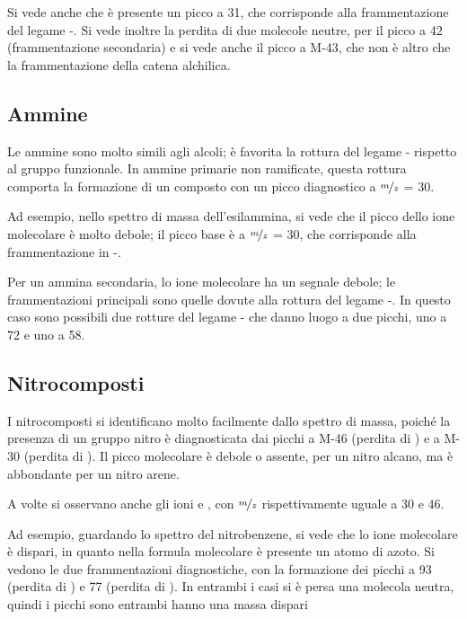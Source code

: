 Si vede anche che è presente un picco a 31, che corrisponde alla
frammentazione del legame \alpha-\beta{}. Si vede inoltre la perdita di
due molecole neutre, per il picco a 42 (frammentazione secondaria) e si
vede anche il picco a M-43, che non è altro che la frammentazione della
catena alchilica.

\subsection{Ammine}

Le ammine sono molto simili agli alcoli; è favorita la rottura del
legame \alpha-\beta{} rispetto al gruppo funzionale. In ammine primarie
non ramificate, questa rottura comporta la formazione di un composto con
un picco diagnostico a $\nicefrac{m}{z}$ = 30.


Ad esempio, nello spettro di massa dell'esilammina, si vede che il picco
dello ione molecolare è molto debole; il picco base è a $\nicefrac{m}{z}$ = 30, che
corrisponde alla frammentazione in \alpha-\beta{}.


Per un ammina secondaria, lo ione molecolare ha un segnale debole; le
frammentazioni principali sono quelle dovute alla rottura del legame
\alpha-\beta{}. In questo caso sono possibili due rotture del legame
\alpha-\beta{} che danno luogo a due picchi, uno a 72 e uno a 58.

\vfill

\pagebreak

\subsection{Nitrocomposti}

I nitrocomposti si identificano molto facilmente dallo spettro di massa,
poiché la presenza di un gruppo nitro è diagnosticata dai picchi a M-46
(perdita di ) e a M-30 (perdita di ). Il picco molecolare
è debole o assente, per un nitro alcano, ma è abbondante per un nitro
arene.

A volte si osservano anche gli ioni  e , con $\nicefrac{m}{z}$
rispettivamente uguale a 30 e 46.


Ad esempio, guardando lo spettro del nitrobenzene, si vede che lo ione
molecolare è dispari, in quanto nella formula molecolare è presente un
atomo di azoto. Si vedono le due frammentazioni diagnostiche, con la
formazione dei picchi a 93 (perdita di ) e 77 (perdita di
). In entrambi i casi si è persa una molecola neutra, quindi i
picchi sono entrambi hanno una massa dispari

